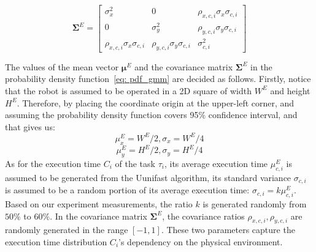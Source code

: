 \begin{equation}
\boldsymbol{\Sigma}^E =
\begin{bmatrix}
    \sigma_x^2 & 0 & \rho_{x,c,i} \sigma_x \sigma_{c,i} \\
    0 & \sigma_y^2 & \rho_{y,c,i} \sigma_y \sigma_{c,i} \\
    \rho_{x,c,i} \sigma_x \sigma_{c,i} & \rho_{y,c,i} \sigma_y \sigma_{c,i} & \sigma_{c,i}^2
\end{bmatrix}
\end{equation}

The values of the mean vector $\boldsymbol{\mu}^E$ and the covariance matrix $ \boldsymbol{\Sigma}^E$ in the probability density function~\eqref{eq: pdf_gmm} are decided as follows. 
Firstly, notice that the robot is assumed to be operated in a 2D square of width $W^E$ and height $H^E$. Therefore, by placing the coordinate origin at the upper-left corner, and assuming the probability density function covers 95\% confidence interval, and that gives us:
\begin{equation}
    \mu^E_x = W^E/2, \sigma_x = W^E/4
\end{equation}
\begin{equation}
    \mu^E_y = H^E/2, \sigma_y = H^E/4
\end{equation}
As for the execution time $C_i$ of the task $\tau_i$, its average execution time $\mu^E_{c,i}$ is assumed to be generated from the Uunifast algorithm, its standard variance $\sigma_{c,i}$ is assumed to be a random portion of its average execution time: $\sigma_{c,i}=k\mu^E_{c,i}$. Based on our experiment measurements, the ratio $k$ is generated randomly from $50\%$ to $60\%$.
In the covariance matrix $\boldsymbol{\Sigma}^E$, the covariance ratios $\rho_{x,c,i}, \rho_{y,c,i}$ are randomly generated in the range $[-1,1]$. These two parameters capture the execution time distribution $C_i$'s dependency on the physical environment.
